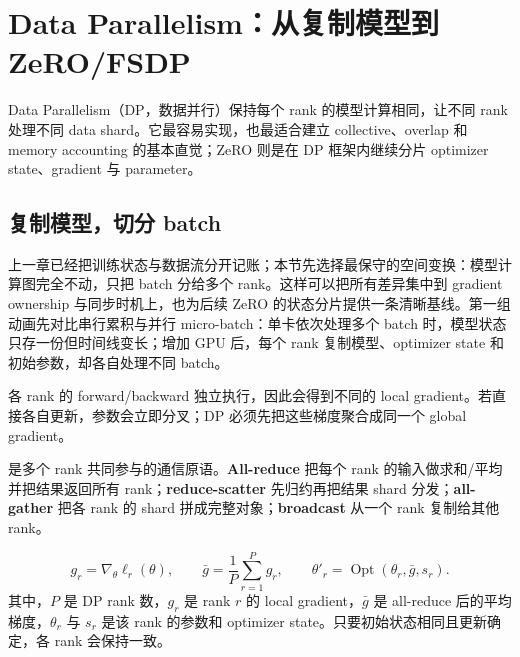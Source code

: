 \section{Data Parallelism：从复制模型到 ZeRO/FSDP}

Data Parallelism（DP，数据并行）保持每个 rank 的模型计算相同，让不同 rank 处理不同 data shard。它最容易实现，也最适合建立 collective、overlap 和 memory accounting 的基本直觉；ZeRO 则是在 DP 框架内继续分片 optimizer state、gradient 与 parameter。

\subsection{复制模型，切分 batch}

上一章已经把训练状态与数据流分开记账；本节先选择最保守的空间变换：模型计算图完全不动，只把 batch 分给多个 rank。这样可以把所有差异集中到 gradient ownership 与同步时机上，也为后续 ZeRO 的状态分片提供一条清晰基线。第一组动画先对比串行累积与并行 micro-batch：单卡依次处理多个 batch 时，模型状态只存一份但时间线变长；增加 GPU 后，每个 rank 复制模型、optimizer state 和初始参数，却各自处理不同 batch。



各 rank 的 forward/backward 独立执行，因此会得到不同的 local gradient。若直接各自更新，参数会立即分叉；DP 必须先把这些梯度聚合成同一个 global gradient。


是多个 rank 共同参与的通信原语。\textbf{All-reduce} 把每个 rank 的输入做求和/平均并把结果返回所有 rank；\textbf{reduce-scatter} 先归约再把结果 shard 分发；\textbf{all-gather} 把各 rank 的 shard 拼成完整对象；\textbf{broadcast} 从一个 rank 复制给其他 rank。


\[
g_r=\nabla_\theta \ell_r(\theta),
\qquad
\bar g=\frac{1}{P}\sum_{r=1}^{P}g_r,
\qquad
\theta'_r=\operatorname{Opt}(\theta_r,\bar g,s_r).
\]
其中，$P$ 是 DP rank 数，$g_r$ 是 rank $r$ 的 local gradient，$\bar g$ 是 all-reduce 后的平均梯度，$\theta_r$ 与 $s_r$ 是该 rank 的参数和 optimizer state。只要初始状态相同且更新确定，各 rank 会保持一致。

